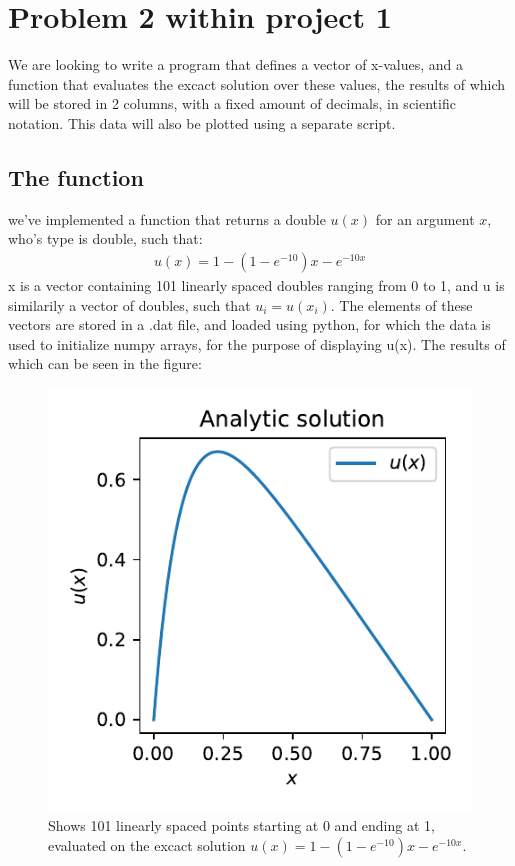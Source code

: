 \documentclass{article}
\begin{document}
\section{Problem 2 within project 1}
We are looking to write a program that defines a vector of x-values, and a function that evaluates the excact solution over these values, the results of which
will be stored in 2 columns, with a fixed amount of decimals, in scientific notation. This data will also be plotted  using a separate script.
\subsection*{The function}
we've implemented a function that returns a double $u(x)$ for an argument $x$, who's type is double, such that:
\begin{align}    
    \label{eq:excact_solution}
    u(x) =  1 - (1-e^{-10})x - e^{-10x}
\end{align}
x is a vector containing 101 linearly spaced doubles ranging from 0 to 1, and u is similarily a vector of doubles, such that $u_i=u(x_i)$. The elements of these vectors are stored in a .dat file,
and loaded using python, for which the data is used to initialize numpy arrays, for the purpose of displaying u(x). The results of which can be seen in the figure:
\begin{figure}[h]
    \includegraphics{problem_2_fig.pdf}
    \caption{Shows 101 linearly spaced points starting at 0 and ending at 1, evaluated on the excact solution $u(x)=1 - (1 - e^{-10})x - e^{-10x}$.}
\end{figure}
\end{document}
